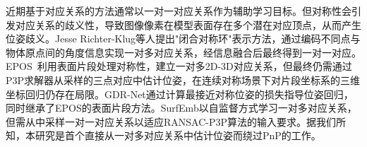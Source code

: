 \par 近期基于对应关系的方法通常以一对一对应关系作为辅助学习目标。但对称性会引发对应关系的歧义性，导致图像像素在模型表面存在多个潜在对应顶点，从而产生位姿歧义。Jesse Richter-Klug等人\cite{richter2021handling}提出"闭合对称环"表示方法，通过编码不同点与物体原点间的角度信息实现一对多对应关系，经信息融合后最终得到一对一对应。EPOS~\cite{hodan2020epos}利用表面片段处理对称性，建立一对多2D-3D对应关系，但最终仍需通过P3P求解器从采样的三点对应中估计位姿，在连续对称场景下对片段坐标系的三维坐标回归仍存在局限。GDR-Net\cite{wang2021gdr}通过计算最接近对称位姿的损失指导位姿回归，同时继承了EPOS\cite{hodan2020epos}的表面片段方法。SurfEmb\cite{haugaard2022surfemb}以自监督方式学习一对多对应关系，但需从中采样一对一对应关系以适应RANSAC-P3P算法的输入要求。据我们所知，本研究是首个直接从一对多对应关系中估计位姿而绕过PnP的工作。